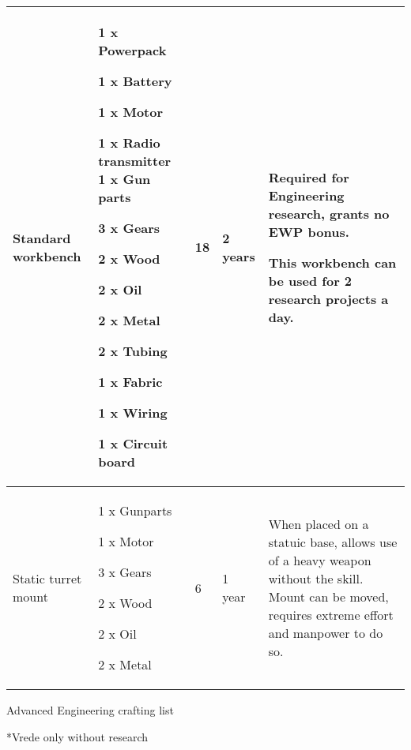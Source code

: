 \documentclass{scrbook}
\begin{document}
\begin{table}
\begin{tabular}{|l|l|l|l|l|}
 \hline Standard workbench & 1 x Powerpack\par 1 x Battery\par 1 x Motor\par 1 x Radio transmitter 1 x Gun parts\par 3 x Gears\par 2 x Wood\par 2 x Oil\par 2 x Metal\par 2 x Tubing\par 1 x Fabric\par 1 x Wiring\par 1 x Circuit board & 18 & 2 years & Required for Engineering research, grants no EWP bonus.\par This workbench can be used for 2 research projects a day. \\
 \hline Static turret mount & 1 x Gunparts\par 1 x Motor\par 3 x Gears\par 2 x Wood\par 2 x Oil\par 2 x Metal & 6 & 1 year & When placed on a statuic base, allows use of a heavy weapon without the skill. Mount can be moved, requires extreme effort and manpower to do so. \\
 \hline \end{tabular}

\end{table}

Advanced Engineering crafting list

*Vrede only without research
\end{document}
